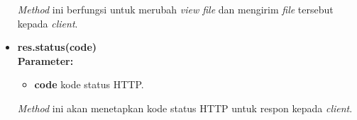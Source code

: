 \begin{itemize}
	\textit{Method} ini berfungsi untuk merubah \textit{view file} dan mengirim \textit{file} tersebut kepada \textit{client}.
	
	
%	
%
%
	
	\item \textbf{res.status(code)} \\ \textbf{Parameter:}
	\begin{itemize}
		\item \textbf{code} kode status HTTP.
	\end{itemize}
	
	\textit{Method} ini akan menetapkan kode status HTTP untuk respon kepada \textit{client}. 
	
	
%	
%	
	
\end{itemize}

